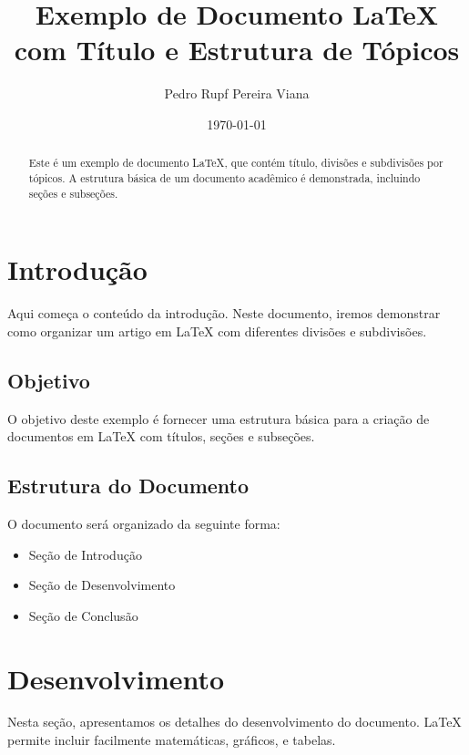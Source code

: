 \documentclass[a4paper,12pt]{article}  %
\title{Exemplo de Documento LaTeX com Título e Estrutura de Tópicos}  %
\author{Pedro Rupf Pereira Viana}            %
\date{\today}                %
\begin{document}

\maketitle  %

\begin{abstract}  %
    Este é um exemplo de documento LaTeX, que contém título, divisões e subdivisões por tópicos. 
    A estrutura básica de um documento acadêmico é demonstrada, incluindo seções e subseções.
\end{abstract}

\tableofcontents  %

\newpage  %

\section{Introdução}  %
Aqui começa o conteúdo da introdução. Neste documento, iremos demonstrar como organizar um artigo em LaTeX com diferentes divisões e subdivisões.

\subsection{Objetivo}  %
O objetivo deste exemplo é fornecer uma estrutura básica para a criação de documentos em LaTeX com títulos, seções e subseções.

\subsection{Estrutura do Documento}  %
O documento será organizado da seguinte forma:
\begin{itemize}
    \item Seção de Introdução
    \item Seção de Desenvolvimento
    \item Seção de Conclusão
\end{itemize}

\section{Desenvolvimento}  %
Nesta seção, apresentamos os detalhes do desenvolvimento do documento. LaTeX permite incluir facilmente matemáticas, gráficos, e tabelas.
\end{document}

